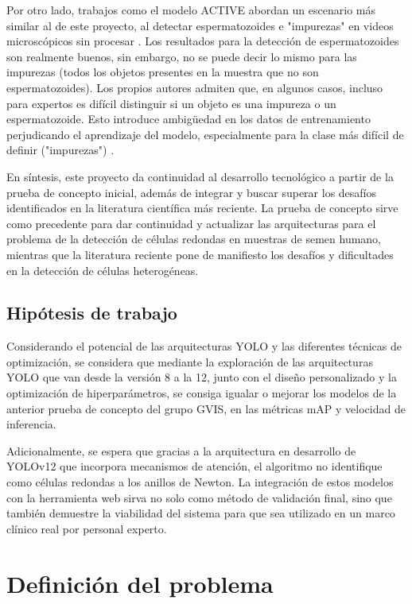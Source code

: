 \documentclass[12pt,a4paper,onecolumn,oneside]{report}
\begin{document}
Por otro lado, trabajos como el modelo ACTIVE abordan un escenario más similar al de este proyecto, al detectar espermatozoides e "impurezas" en videos microscópicos sin procesar \cite{chen2024}. Los resultados para la detección de espermatozoides son realmente buenos, sin embargo, no se puede decir lo mismo
para las impurezas (todos los objetos presentes en la muestra que no son espermatozoides). Los propios autores admiten que, en algunos casos, incluso para expertos es difícil distinguir si un objeto
es una impureza o un espermatozoide. Esto introduce ambigüedad en los datos de entrenamiento perjudicando el aprendizaje del modelo, especialmente para la clase más difícil de definir ("impurezas") \cite{chen2024}.

En síntesis, este proyecto da continuidad al desarrollo tecnológico a partir de la prueba de concepto inicial, además de integrar y buscar superar los desafíos identificados en la literatura científica más reciente. La prueba de concepto sirve como precedente para dar continuidad y actualizar las 
arquitecturas para el problema de la detección de células redondas en muestras de semen humano, mientras que la literatura reciente pone de manifiesto los desafíos y dificultades en la detección de células heterogéneas. 


\subsection{Hipótesis de trabajo}

Considerando el potencial de las arquitecturas YOLO y las diferentes técnicas de optimización, se considera que mediante la exploración de las arquitecturas YOLO que van desde la versión 8 a la 12, 
junto con el diseño personalizado y la optimización de hiperparámetros, se consiga igualar o mejorar los modelos de la anterior prueba de concepto del grupo GVIS, 
en las métricas mAP y velocidad de inferencia. 

Adicionalmente, se espera que gracias a la arquitectura en desarrollo de YOLOv12 que incorpora mecanismos de atención, el algoritmo no identifique 
como células redondas a los anillos de Newton. La integración de estos modelos con la herramienta web sirva no solo como método de validación final, sino que también demuestre la viabilidad del sistema 
para que sea utilizado en un marco clínico real por personal experto.

\section{Definición del problema}
\label{sec:Definición del problema}
\end{document}
